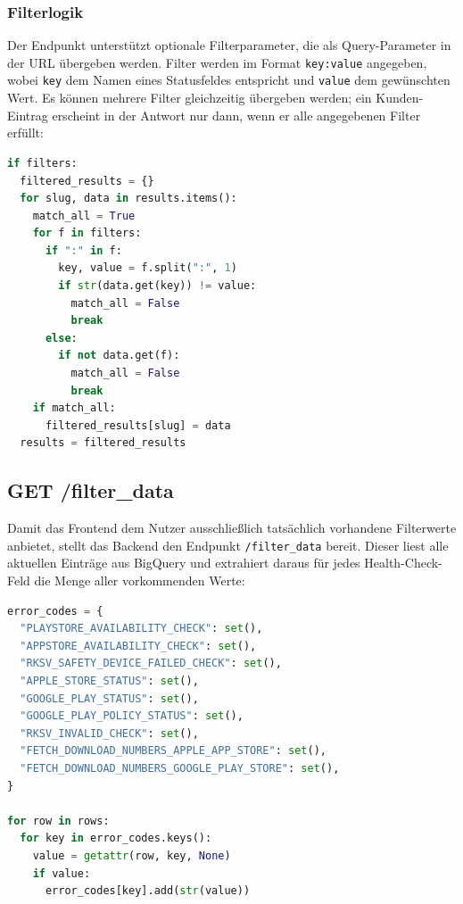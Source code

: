 \subsubsection{Filterlogik}
Der Endpunkt unterstützt optionale Filterparameter, die als Query-Parameter in der URL übergeben werden. Filter werden im Format \texttt{key:value} angegeben, wobei \texttt{key} dem Namen eines Statusfeldes entspricht und \texttt{value} dem gewünschten Wert. Es können mehrere Filter gleichzeitig übergeben werden; ein Kunden-Eintrag erscheint in der Antwort nur dann, wenn er alle angegebenen Filter erfüllt:

\begin{lstlisting}[language=Python, caption={Filterlogik im /health-checks Endpunkt}, label={lst:filter-logic}]
if filters:
  filtered_results = {}
  for slug, data in results.items():
    match_all = True
    for f in filters:
      if ":" in f:
        key, value = f.split(":", 1)
        if str(data.get(key)) != value:
          match_all = False
          break
      else:
        if not data.get(f):
          match_all = False
          break
    if match_all:
      filtered_results[slug] = data
  results = filtered_results
\end{lstlisting}

\subsection{GET /filter\_data}
Damit das Frontend dem Nutzer ausschließlich tatsächlich vorhandene Filterwerte anbietet, stellt das Backend den Endpunkt \texttt{/filter\_data} bereit. Dieser liest alle aktuellen Einträge aus BigQuery und extrahiert daraus für jedes Health-Check-Feld die Menge aller vorkommenden Werte:

\begin{lstlisting}[language=Python, caption={Extraktion verfügbarer Fehlercodes}, label={lst:filter-data}]
error_codes = {
  "PLAYSTORE_AVAILABILITY_CHECK": set(),
  "APPSTORE_AVAILABILITY_CHECK": set(),
  "RKSV_SAFETY_DEVICE_FAILED_CHECK": set(),
  "APPLE_STORE_STATUS": set(),
  "GOOGLE_PLAY_STATUS": set(),
  "GOOGLE_PLAY_POLICY_STATUS": set(),
  "RKSV_INVALID_CHECK": set(),
  "FETCH_DOWNLOAD_NUMBERS_APPLE_APP_STORE": set(),
  "FETCH_DOWNLOAD_NUMBERS_GOOGLE_PLAY_STORE": set(),
}

for row in rows:
  for key in error_codes.keys():
    value = getattr(row, key, None)
    if value:
      error_codes[key].add(str(value))
\end{lstlisting}

